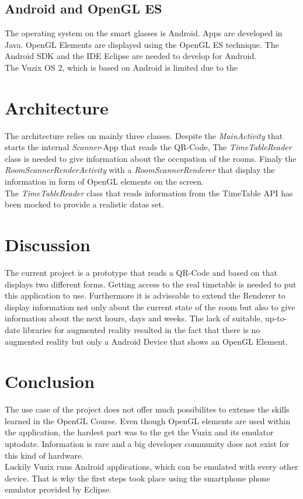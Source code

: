 \documentclass[]{article}
\begin{document}
\begin{multicols}{2}
\subsection{Android and OpenGL ES}
The operating system on the smart glasses is Android. Apps are developed in Java. OpenGL Elements are displayed using the OpenGL ES technique. 
\newline
The Android SDK and the IDE Eclipse are needed to develop for Android. \\
The Vuzix OS 2, which is based on Android is limited due to the 
\section{Architecture}
The architecture relies on mainly three classes. Despite the \emph{MainActivity} that starts the internal \emph{Scanner}-App that reads the QR-Code, The \emph{TimeTableReader} class is needed to give information about the occupation of the rooms. Finaly the \emph{RoomScannerRenderActivity} with a \emph{RoomScannerRenderer} that display the information in form of OpenGL elements on the screen.  \\
The \emph{TimeTableReader} class that reads information from the TimeTable API has been mocked to provide a realistic datas set. 
\section{Discussion}
The current project is a prototype that reads a QR-Code and based on that displays two different forms. Getting access to the real timetable is needed to put this application to use. Furthermore it is adviseable to extend the Renderer to display information not only about the current state of the room but also to give information about the next hours, days and weeks.\newline
The lack of suitable, up-to-date libraries for augmented reality resulted in the fact that there is no augmented reality but only a Android Device that shows an OpenGL Element.  
\section{Conclusion}
The use case of the project does not offer much possibilites to extense the skills learned in the OpenGL Course. Even though OpenGL elements are used within the application, the hardest part was to the get the Vuzix and its emulator uptodate. Information is rare and a big developer community does not exist for this kind of hardware. \\
Luckily Vuzix runs Android applications, which can be emulated with every other device. That is why the first steps took place using the smartphone phone emulator provided by Eclipse. \\

\end{multicols}
\end{document}
